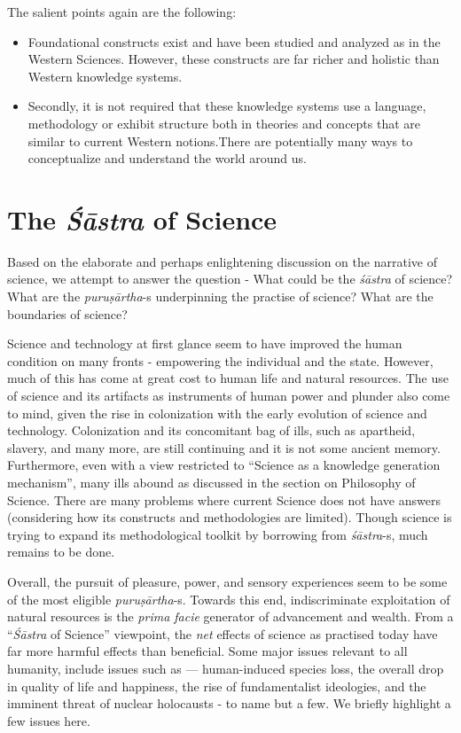 The salient points again are the following:

\begin{itemize}
\item Foundational constructs exist and have been studied and analyzed as in the Western Sciences. However, these constructs are far richer and holistic than Western knowledge systems.

 \item Secondly, it is not required that these knowledge systems use a language, methodology or exhibit structure both in theories and concepts that are similar to current Western notions.There are potentially many ways to conceptualize and understand the world around us.

\end{itemize}


\section*{The \textit{Śāstra} of Science}

Based on the elaborate and perhaps enlightening discussion on the narrative of science, we attempt to answer the question - What could be the \textit{śāstra} of science? What are the \textit{puruṣārtha}-s underpinning the practise of science? What are the boundaries of science?

Science and technology at first glance seem to have improved the human condition on many fronts - empowering the individual and the state. However, much of this has come at great cost to human life and natural resources. The use of science and its artifacts as instruments of human power and plunder also come to mind, given the rise in colonization with the early evolution of science and technology. Colonization and its concomitant bag of ills, such as apartheid, slavery, and many more, are still continuing and it is not some ancient memory. Furthermore, even with a view restricted to “Science as a knowledge generation mechanism”, many ills abound as discussed in the section on Philosophy of Science. There are many problems where current Science does not have answers (considering how its constructs and methodologies are limited). Though science is trying to expand its methodological toolkit by borrowing from \textit{śāstra}-s, much remains to be done.

Overall, the pursuit of pleasure, power, and sensory experiences seem to be some of the most eligible \textit{puruṣārtha}-s. Towards this end, indiscriminate exploitation of natural resources is the \textit{prima facie} generator of advancement and wealth. From a “\textit{Śāstra} of Science” viewpoint, the \textit{net} effects of science as practised today have far more harmful effects than beneficial. Some major issues relevant to all humanity, include issues such as — human-induced species loss, the overall drop in quality of life and happiness, the rise of fundamentalist ideologies, and the imminent threat of nuclear holocausts - to name but a few. We briefly highlight a few issues here.

